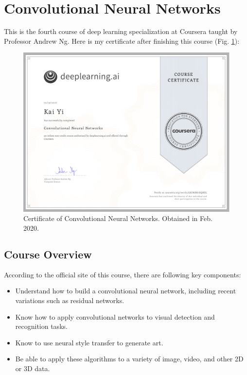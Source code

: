 \section{Convolutional Neural Networks}  
This is the fourth course of deep learning specialization at Coursera taught by Professor Andrew Ng. Here is my certificate after finishing this course (Fig. \ref{C4-Certificate}):

\begin{figure}[!htbp]
    \centering
    \includegraphics[width=1.0\textwidth]{img/C4-Certificate.pdf}
    \caption{Certificate of Convolutional Neural Networks. Obtained in Feb. 2020.}
    \label{C4-Certificate}
\end{figure}

\subsection{Course Overview}
According to the official site of this course, there are following key components:

\begin{itemize}
    \item Understand how to build a convolutional neural network, including recent variations such as residual networks.
    \item Know how to apply convolutional networks to visual detection and recognition tasks.
    \item Know to use neural style transfer to generate art.
    \item Be able to apply these algorithms to a variety of image, video, and other 2D or 3D data.
\end{itemize}

